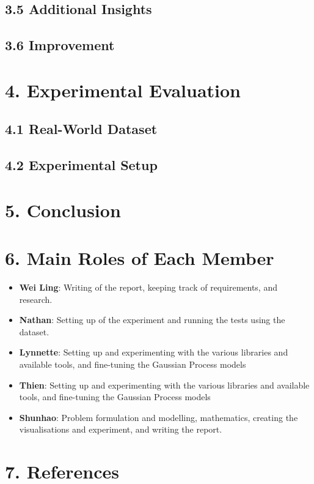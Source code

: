 \documentclass[letterpaper]{article}
\begin{document}
\subsection{3.5  Additional Insights}


\subsection{3.6  Improvement}



\section{4.  Experimental Evaluation}



\subsection{4.1  Real-World Dataset}



\subsection{4.2  Experimental Setup}



\section{5.  Conclusion}



\section{6. Main Roles of Each Member}
\begin{itemize}
\item \textbf{Wei Ling}: 
Writing of the report, keeping track of requirements, and research.
\item \textbf{Nathan}: 
Setting up of the experiment and running the tests using the dataset.
\item \textbf{Lynnette}: 
Setting up and experimenting with the various libraries and available tools, and fine-tuning the Gaussian Process models
\item \textbf{Thien}: 
Setting up and experimenting with the various libraries and available tools, and fine-tuning the Gaussian Process models
\item \textbf{Shunhao}: 
Problem formulation and modelling, mathematics, creating the visualisations and experiment, and writing the report.
\end{itemize}

\section{7.  References}
\end{document}
